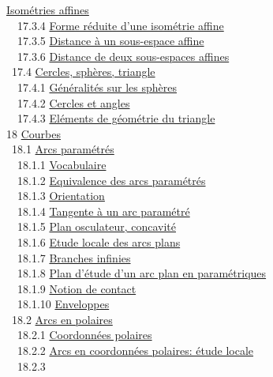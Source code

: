\documentclass[]{article}
\begin{document}
\href{coursse94.html\#x114-52500017.3.3}{Isométries affines} \\ ~~17.3.4
\href{coursse94.html\#x114-52600017.3.4}{Forme réduite d'une isométrie
affine} \\ ~~17.3.5 \href{coursse94.html\#x114-52700017.3.5}{Distance à
un sous-espace affine} \\ ~~17.3.6
\href{coursse94.html\#x114-52800017.3.6}{Distance de deux sous-espaces
affines} \\ ~17.4 \href{coursse95.html\#x115-52900017.4}{Cercles,
sphères, triangle} \\ ~~17.4.1
\href{coursse95.html\#x115-53000017.4.1}{Généralités sur les sphères} \\
~~17.4.2 \href{coursse95.html\#x115-53100017.4.2}{Cercles et angles} \\
~~17.4.3 \href{coursse95.html\#x115-53200017.4.3}{Eléments de géométrie
du triangle} \\ 18 \href{coursch19.html\#x116-53300018}{Courbes} \\
~18.1 \href{coursse96.html\#x117-53400018.1}{Arcs paramétrés} \\
~~18.1.1 \href{coursse96.html\#x117-53500018.1.1}{Vocabulaire} \\
~~18.1.2 \href{coursse96.html\#x117-53600018.1.2}{Equivalence des arcs
paramétrés} \\ ~~18.1.3
\href{coursse96.html\#x117-53700018.1.3}{Orientation} \\ ~~18.1.4
\href{coursse96.html\#x117-53800018.1.4}{Tangente à un arc paramétré} \\
~~18.1.5 \href{coursse96.html\#x117-53900018.1.5}{Plan osculateur,
concavité} \\ ~~18.1.6 \href{coursse96.html\#x117-54000018.1.6}{Etude
locale des arcs plans} \\ ~~18.1.7
\href{coursse96.html\#x117-54100018.1.7}{Branches infinies} \\ ~~18.1.8
\href{coursse96.html\#x117-54200018.1.8}{Plan d'étude d'un arc plan en
paramétriques} \\ ~~18.1.9
\href{coursse96.html\#x117-54300018.1.9}{Notion de contact} \\ ~~18.1.10
\href{coursse96.html\#x117-54400018.1.10}{Enveloppes} \\ ~18.2
\href{coursse97.html\#x118-54500018.2}{Arcs en polaires} \\ ~~18.2.1
\href{coursse97.html\#x118-54600018.2.1}{Coordonnées polaires} \\
~~18.2.2 \href{coursse97.html\#x118-54700018.2.2}{Arcs en coordonnées
polaires: étude locale} \\ ~~18.2.3
\end{document}
